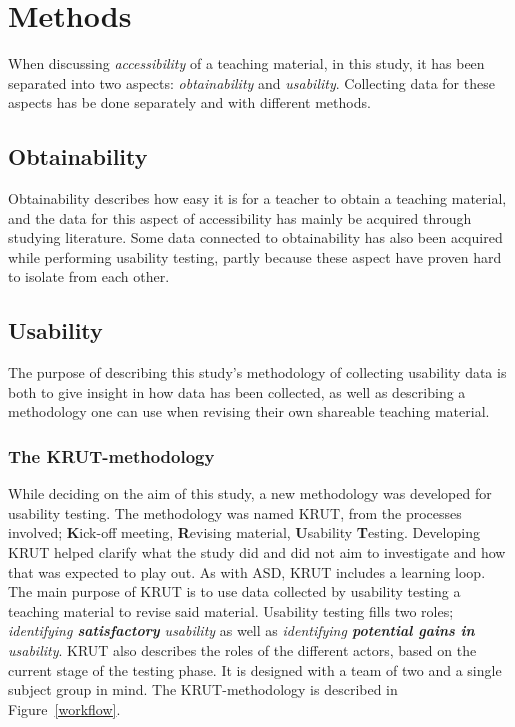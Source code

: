 \chapter{Methods}
When discussing \textit{accessibility} of a teaching material, in this study, it has been separated into two aspects: \textit{obtainability} and \textit{usability}. Collecting data for these aspects has be done separately and with different methods.

\section{Obtainability}
Obtainability describes how easy it is for a teacher to obtain a teaching material, and the data for this aspect of accessibility has mainly be acquired through studying literature. Some data connected to obtainability has also been acquired while performing usability testing, partly because these aspect have proven hard to isolate from each other.

\section{Usability}
The purpose of describing this study's methodology of collecting usability data is both to give insight in how data has been collected, as well as describing a methodology one can use when revising their own shareable teaching material.

\subsection{The KRUT-methodology}
While deciding on the aim of this study, a new methodology was developed for usability testing. The methodology was named KRUT, from the processes involved; \textbf{K}ick-off meeting, \textbf{R}evising material, \textbf{U}sability \textbf{T}esting. Developing KRUT helped clarify what the study did and did not aim to investigate and how that was expected to play out. As with ASD, KRUT includes a learning loop. The main purpose of KRUT is to use data collected by usability testing a teaching material to revise said material. Usability testing fills two roles; \textit{identifying \textbf{satisfactory} usability} as well as \textit{identifying \textbf{potential gains in} usability}. KRUT also describes the roles of the different actors, based on the current stage of the testing phase. It is designed with a team of two and a single subject group in mind. The KRUT-methodology is described in Figure~\ref{workflow}.

